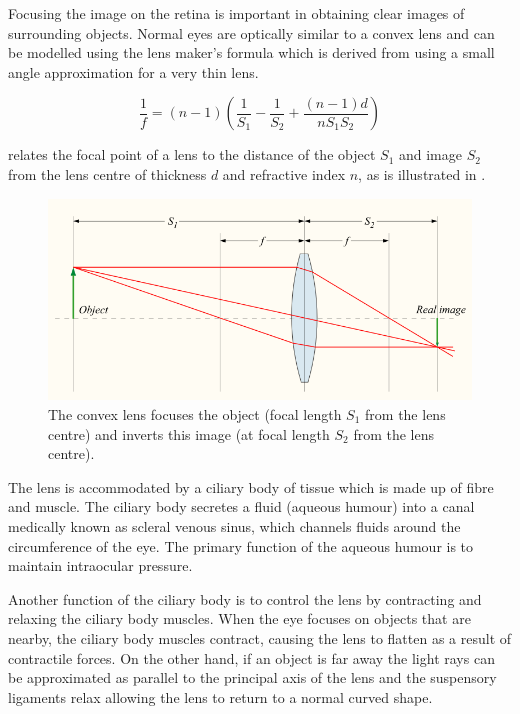 Focusing the image on the retina is important in obtaining clear images of
surrounding objects. Normal eyes are optically similar to a convex lens
and can be modelled using the lens maker's formula 
which is derived from  using a small angle approximation
for a very thin lens.

\begin{equation}
 \frac{1}{f} = (n-1) \left( \frac{1}{S_1} - \frac{1}{S_2} + \frac{(n-1)d}{n S_1 S_2} \right)
\label{eq:lens_makers}
\end{equation}

 relates the focal point of a lens to the distance of the object
$S_1$ and image $S_2$ from the lens centre of thickness $d$ and refractive index
$n$, as is illustrated in .\cite{greivenkamp2004field}

\begin{figure}[H]
\centering
  \includegraphics[width=12cm]{figures/convergent_lens2}
\caption{The convex lens focuses the object (focal length $S_1$ from the lens centre)
         and inverts this image (at focal length $S_2$ from the lens centre).
         \cite{greivenkamp2004field}}
\label{fig:convergent_lens}
\end{figure}

The lens is accommodated by a ciliary body of tissue which is made up of fibre and
muscle. The ciliary body secretes a fluid (aqueous humour) into a canal medically
known as scleral venous sinus, which channels fluids around the circumference of
the eye.\cite{bill1970effects,dvorak1934schlemm} The primary function of the
aqueous humour is to maintain intraocular pressure.

Another function of the ciliary body is to control the lens by contracting and relaxing the
ciliary body muscles. When the eye focuses on objects that are nearby, the ciliary body
muscles contract, causing the lens to flatten as a result of contractile forces. On the
other hand, if an  object is far away the light rays can be approximated as parallel to the
principal axis of the lens and the suspensory ligaments relax allowing the lens to return
to a normal curved shape.

